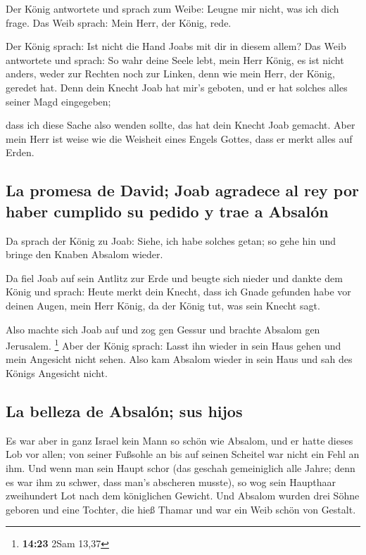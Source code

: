  Der König antwortete und sprach zum Weibe: Leugne mir
nicht, was ich dich frage. Das Weib sprach: Mein Herr, der König, rede.

 Der König sprach: Ist nicht die Hand Joabs mit dir in
diesem allem? Das Weib antwortete und sprach: So wahr deine Seele lebt,
mein Herr König, es ist nicht anders, weder zur Rechten noch zur Linken,
denn wie mein Herr, der König, geredet hat. Denn dein Knecht Joab hat
mir's geboten, und er hat solches alles seiner Magd eingegeben;

 dass ich diese Sache also wenden sollte, das hat dein
Knecht Joab gemacht. Aber mein Herr ist weise wie die Weisheit eines
Engels Gottes, dass er merkt alles auf Erden.

\hypertarget{la-promesa-de-david-joab-agradece-al-rey-por-haber-cumplido-su-pedido-y-trae-a-absaluxf3n}{%
\subsection{La promesa de David; Joab agradece al rey por haber cumplido
su pedido y trae a
Absalón}\label{la-promesa-de-david-joab-agradece-al-rey-por-haber-cumplido-su-pedido-y-trae-a-absaluxf3n}}

 Da sprach der König zu Joab: Siehe, ich habe solches
getan; so gehe hin und bringe den Knaben Absalom wieder.

 Da fiel Joab auf sein Antlitz zur Erde und beugte sich
nieder und dankte dem König und sprach: Heute merkt dein Knecht, dass
ich Gnade gefunden habe vor deinen Augen, mein Herr König, da der König
tut, was sein Knecht sagt.

 Also machte sich Joab auf und zog gen Gessur und brachte
Absalom gen Jerusalem. \footnote{\textbf{14:23} 2Sam 13,37}
 Aber der König sprach: Lasst ihn wieder in sein Haus
gehen und mein Angesicht nicht sehen. Also kam Absalom wieder in sein
Haus und sah des Königs Angesicht nicht.

\hypertarget{la-belleza-de-absaluxf3n-sus-hijos}{%
\subsection{La belleza de Absalón; sus
hijos}\label{la-belleza-de-absaluxf3n-sus-hijos}}

 Es war aber in ganz Israel kein Mann so schön wie
Absalom, und er hatte dieses Lob vor allen; von seiner Fußsohle an bis
auf seinen Scheitel war nicht ein Fehl an ihm.  Und wenn
man sein Haupt schor (das geschah gemeiniglich alle Jahre; denn es war
ihm zu schwer, dass man's abscheren musste), so wog sein Haupthaar
zweihundert Lot nach dem königlichen Gewicht.  Und
Absalom wurden drei Söhne geboren und eine Tochter, die hieß Thamar und
war ein Weib schön von Gestalt.

